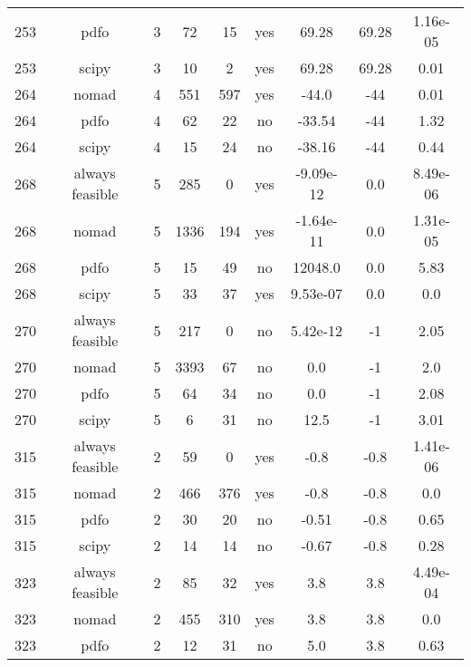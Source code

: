 \begin{footnotesize}
\begin{center}
\begin{longtable}{ccccccccc}
253 &            pdfo &  3 &     72 &     15 &     yes &       69.28 &       69.28 & 1.16e-05\\
253 &           scipy &  3 &     10 &      2 &     yes &       69.28 &       69.28 &     0.01\\
264 &           nomad &  4 &    551 &    597 &     yes &       -44.0 &         -44 &     0.01\\
264 &            pdfo &  4 &     62 &     22 &      no &      -33.54 &         -44 &     1.32\\
264 &           scipy &  4 &     15 &     24 &      no &      -38.16 &         -44 &     0.44\\
268 & always feasible &  5 &    285 &      0 &     yes &   -9.09e-12 &         0.0 & 8.49e-06\\
268 &           nomad &  5 &   1336 &    194 &     yes &   -1.64e-11 &         0.0 & 1.31e-05\\
268 &            pdfo &  5 &     15 &     49 &      no &     12048.0 &         0.0 &     5.83\\
268 &           scipy &  5 &     33 &     37 &     yes &    9.53e-07 &         0.0 &      0.0\\
270 & always feasible &  5 &    217 &      0 &      no &    5.42e-12 &          -1 &     2.05\\
270 &           nomad &  5 &   3393 &     67 &      no &         0.0 &          -1 &      2.0\\
270 &            pdfo &  5 &     64 &     34 &      no &         0.0 &          -1 &     2.08\\
270 &           scipy &  5 &      6 &     31 &      no &        12.5 &          -1 &     3.01\\
315 & always feasible &  2 &     59 &      0 &     yes &        -0.8 &        -0.8 & 1.41e-06\\
315 &           nomad &  2 &    466 &    376 &     yes &        -0.8 &        -0.8 &      0.0\\
315 &            pdfo &  2 &     30 &     20 &      no &       -0.51 &        -0.8 &     0.65\\
315 &           scipy &  2 &     14 &     14 &      no &       -0.67 &        -0.8 &     0.28\\
323 & always feasible &  2 &     85 &     32 &     yes &         3.8 &         3.8 & 4.49e-04\\
323 &           nomad &  2 &    455 &    310 &     yes &         3.8 &         3.8 &      0.0\\
323 &            pdfo &  2 &     12 &     31 &      no &         5.0 &         3.8 &     0.63\\

\end{longtable}
\end{center}
\end{footnotesize}
